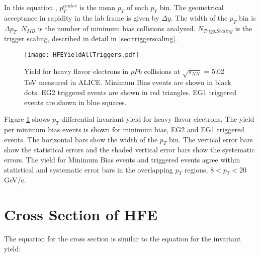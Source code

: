 In this equation \cite{Abelev:2012xe}, $p^{center}_{T}$ is the mean $p_{T}$ of each $p_{T}$ bin. The geometrical acceptance in rapidity in the lab frame is given by $\Delta y$. The width of the $p_{T}$ bin is $\Delta p_{T}$. $N_{MB}$ is the number of minimum bias collisions analyzed. $N_{Trigg.Scaling}$ is the trigger scaling, described in detail in \ref{sec:triggerscaling}.

\begin{figure}[h!]
  \centering
  \texttt{[image: HFEYieldAllTriggers.pdf]}\\
  \caption{Yield for heavy flavor electrons in $pPb$ collisions at $\sqrt{s_{NN}}$ = 5.02 TeV measured in ALICE. Minimum Bias events are shown in black dots. EG2 triggered events are shown in red triangles. EG1 triggered events are shown in blue squares.} \label{fig:HFEYieldAllTriggers}
\end{figure}

Figure \ref{fig:HFEYieldAllTriggers} shows $p_{T}$-differential invariant yield for heavy flavor electrons. The yield per minimum bias events is shown for minimum bias, EG2 and EG1 triggered events. The horizontal bars show the width of the $p_{T}$ bin. The vertical error bars show the statistical errors and the shaded vertical error bars show the systematic errors. The yield for Minimum Bias events and triggered events agree within statistical and systematic error bars in the overlapping $p_{T}$ regions, $8<  p_{T} < 20$ GeV/c. 



\section{Cross Section of HFE}

The equation for the cross section is similar to the equation for the invariant yield:


